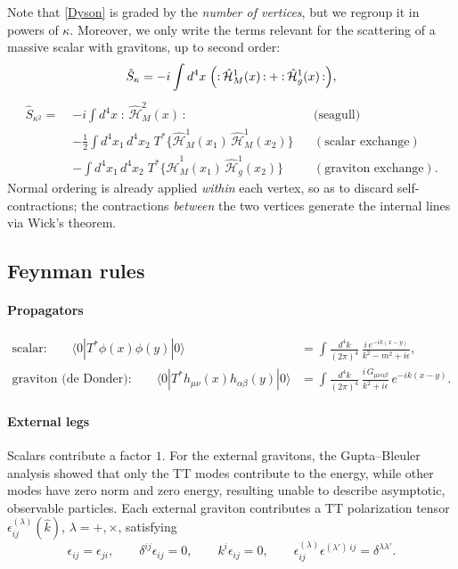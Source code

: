 \documentclass[12pt,a4paper,oneside]{article}
\numberwithin{equation}{section}   %
\begin{document}
Note that \eqref{Dyson} is graded by the \emph{number of vertices}, but we
regroup it in powers of $\kappa$. Moreover, we only write the terms relevant
for the scattering of a massive scalar with gravitons, up to second order:
\begin{equation}\label{Skappa}
\hat{S}_{\kappa}
=-i\int d^4x\;\Bigl({:}\,\hat{\mathcal{H}}_M^{1}(x)\,{:}
+{:}\,\hat{\mathcal{H}}_g^{1}(x)\,{:}\Bigr) ,
\end{equation}
\begin{equation}\label{Skappa2}
\begin{aligned}
\hat{S}_{\kappa^2}
=\;&-i\int d^4x\;{:}\,\hat{\mathcal{H}}_M^{2}(x)\,{:}
&&\text{(seagull)}\\[0.25cm]
&-\frac12\int d^4x_1\, d^4x_2\;
T^*\bigl\{\hat{\mathcal{H}}_M^{1}(x_1)\,\hat{\mathcal{H}}_M^{1}(x_2)\bigr\}
&&(\text{scalar exchange})\\[0.25cm]
&-\int d^4x_1\, d^4x_2\;
T^*\bigl\{\hat{\mathcal{H}}_M^{1}(x_1)\,\hat{\mathcal{H}}_g^{1}(x_2)\bigr\}
&&(\text{graviton exchange}).
\end{aligned}
\end{equation}
Normal ordering is already applied \emph{within} each vertex, so as to discard
self-contractions; the contractions \emph{between} the two vertices generate
the internal lines via Wick's theorem.

\subsection{Feynman rules}
\label{RULES}
\paragraph{Propagators}
\begin{align}
\text{scalar:}\qquad
\langle 0|T^{*}\phi(x)\phi(y)|0\rangle
&=\int\!\frac{d^4k}{(2\pi)^4}\,
\frac{i\,e^{-ik(x-y)}}{k^{2}-m^{2}+i\epsilon},\\[0.3cm]
\text{graviton (de Donder):}\qquad
\langle 0|T^{*}h_{\mu\nu}(x)h_{\alpha\beta}(y)|0\rangle
&=\int\!\frac{d^4k}{(2\pi)^4}\,
\frac{i\,G_{\mu\nu\alpha\beta}}{k^{2}+i\epsilon}\,e^{-ik(x-y)} .
\end{align}

\paragraph{External legs}
Scalars contribute a factor $1$. For the external gravitons, the
Gupta--Bleuler analysis showed that only the TT modes contribute to the energy,
while other modes have zero norm and
zero energy, resulting unable to describe asymptotic, observable
 particles. 
 Each external graviton
contributes a TT polarization tensor $\epsilon_{ij}^{(\lambda)}(\hat k)$,
$\lambda=+,\times$, satisfying
\begin{equation}
    \epsilon_{ij}=\epsilon_{ji},\qquad
    \delta^{ij}\epsilon_{ij}=0,\qquad
    k^{i}\epsilon_{ij}=0,\qquad
    \epsilon^{(\lambda)}_{ij}\epsilon^{(\lambda')\,ij}=\delta^{\lambda\lambda'} .
\end{equation}
\end{document}
